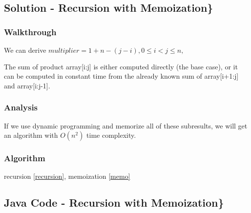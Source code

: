 \documentclass[]{book}
\begin{document}
\hypertarget{solution---recursion-with-memoization}{%
\subsection{Solution - Recursion with Memoization\}}\label{solution---recursion-with-memoization}}

\hypertarget{walkthrough-38}{%
\subsubsection{Walkthrough}\label{walkthrough-38}}

We can derive \(multiplier = 1 + n - (j - i), 0 \le i < j \le n,\)

The sum of product array{[}i:j{]} is either computed directly (the base case), or it can be computed in constant time from
the already known sum of array{[}i+1:j{]} and array{[}i:j-1{]}.

\hypertarget{analysis-41}{%
\subsubsection{Analysis}\label{analysis-41}}

If we use dynamic programming and memorize all of these subresults, we will get an algorithm with \(O(n^2)\) time
complexity.

\hypertarget{algorithm-41}{%
\subsubsection{Algorithm}\label{algorithm-41}}

recursion \ref{recursion}, memoization \ref{memo}

\hypertarget{java-code---recursion-with-memoization}{%
\subsection{Java Code - Recursion with Memoization\}}\label{java-code---recursion-with-memoization}}
\end{document}
